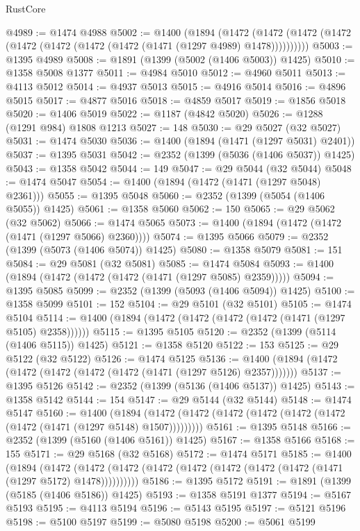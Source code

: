 \begin{lexlean}{RustCore}
\begin{coremodule}
{\begin{coremodule}
{{{{{{{{{{{{{{{{{{{{{{{{{{{{{{{{{{{{{{{{{{{{@4989 := @1474 @4988
@5002 := @1400
    (@1894
      (@1472 (@1472 (@1472 (@1472 (@1472 (@1472 (@1472 (@1472 (@1471 (@1297 @4989) @1478))))))))))
@5003 := @1395 @4989
@5008 := @1891 (@1399 (@5002 (@1406 @5003)) @1425)
@5010 := @1358 @5008 @1377
@5011 := @4984 @5010
@5012 := @4960 @5011
@5013 := @4113 @5012
@5014 := @4937 @5013
@5015 := @4916 @5014
@5016 := @4896 @5015
@5017 := @4877 @5016
@5018 := @4859 @5017
@5019 := @1856 @5018
@5020 := @1406 @5019
@5022 := @1187 (@4842 @5020)
@5026 := @1288 (@1291 @984) @1808 @1213
@5027 := 148
@5030 := @29 @5027 (@32 @5027)
@5031 := @1474 @5030
@5036 := @1400 (@1894 (@1471 (@1297 @5031) @2401))
@5037 := @1395 @5031
@5042 := @2352 (@1399 (@5036 (@1406 @5037)) @1425)
@5043 := @1358 @5042
@5044 := 149
@5047 := @29 @5044 (@32 @5044)
@5048 := @1474 @5047
@5054 := @1400 (@1894 (@1472 (@1471 (@1297 @5048) @2361)))
@5055 := @1395 @5048
@5060 := @2352 (@1399 (@5054 (@1406 @5055)) @1425)
@5061 := @1358 @5060
@5062 := 150
@5065 := @29 @5062 (@32 @5062)
@5066 := @1474 @5065
@5073 := @1400 (@1894 (@1472 (@1472 (@1471 (@1297 @5066) @2360))))
@5074 := @1395 @5066
@5079 := @2352 (@1399 (@5073 (@1406 @5074)) @1425)
@5080 := @1358 @5079
@5081 := 151
@5084 := @29 @5081 (@32 @5081)
@5085 := @1474 @5084
@5093 := @1400 (@1894 (@1472 (@1472 (@1472 (@1471 (@1297 @5085) @2359)))))
@5094 := @1395 @5085
@5099 := @2352 (@1399 (@5093 (@1406 @5094)) @1425)
@5100 := @1358 @5099
@5101 := 152
@5104 := @29 @5101 (@32 @5101)
@5105 := @1474 @5104
@5114 := @1400 (@1894 (@1472 (@1472 (@1472 (@1472 (@1471 (@1297 @5105) @2358))))))
@5115 := @1395 @5105
@5120 := @2352 (@1399 (@5114 (@1406 @5115)) @1425)
@5121 := @1358 @5120
@5122 := 153
@5125 := @29 @5122 (@32 @5122)
@5126 := @1474 @5125
@5136 := @1400 (@1894 (@1472 (@1472 (@1472 (@1472 (@1472 (@1471 (@1297 @5126) @2357)))))))
@5137 := @1395 @5126
@5142 := @2352 (@1399 (@5136 (@1406 @5137)) @1425)
@5143 := @1358 @5142
@5144 := 154
@5147 := @29 @5144 (@32 @5144)
@5148 := @1474 @5147
@5160 := @1400
    (@1894 (@1472 (@1472 (@1472 (@1472 (@1472 (@1472 (@1472 (@1471 (@1297 @5148) @1507)))))))))
@5161 := @1395 @5148
@5166 := @2352 (@1399 (@5160 (@1406 @5161)) @1425)
@5167 := @1358 @5166
@5168 := 155
@5171 := @29 @5168 (@32 @5168)
@5172 := @1474 @5171
@5185 := @1400
    (@1894
      (@1472 (@1472 (@1472 (@1472 (@1472 (@1472 (@1472 (@1472 (@1471 (@1297 @5172) @1478))))))))))
@5186 := @1395 @5172
@5191 := @1891 (@1399 (@5185 (@1406 @5186)) @1425)
@5193 := @1358 @5191 @1377
@5194 := @5167 @5193
@5195 := @4113 @5194
@5196 := @5143 @5195
@5197 := @5121 @5196
@5198 := @5100 @5197
@5199 := @5080 @5198
@5200 := @5061 @5199
}}}}}}}}}}}}}}}}}}}}}}}}}}}}}}}}}}}}}}}}}}}}
\end{coremodule}}
\end{coremodule}
\end{lexlean}
